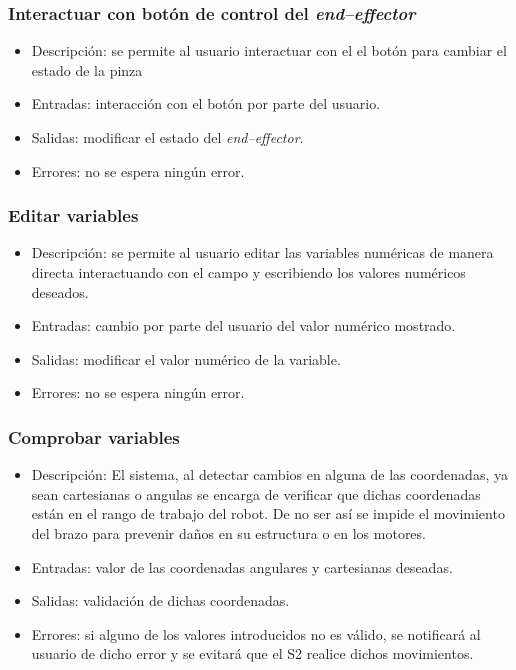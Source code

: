 \subsubsection{Interactuar con botón de control del \textit{end--effector}}
\begin{itemize}
    \item Descripción: se permite al usuario interactuar con el el botón para cambiar el estado de la pinza
    \item Entradas: interacción con el botón por parte del usuario.
    \item Salidas: modificar el estado del \textit{end--effector}.
    \item Errores: no se espera ningún error.
\end{itemize}

\subsubsection{Editar variables}
\begin{itemize}
    \item Descripción: se permite al usuario editar las variables numéricas de manera directa interactuando con el campo y escribiendo los valores numéricos deseados.
    \item Entradas: cambio por parte del usuario del valor numérico mostrado.
    \item Salidas: modificar el valor numérico de la variable.
    \item Errores: no se espera ningún error.
\end{itemize}

\subsubsection{Comprobar variables}
\begin{itemize}
    \item Descripción: El sistema, al detectar cambios en alguna de las coordenadas, ya sean cartesianas o angulas se encarga de verificar que dichas coordenadas están en el rango de trabajo del robot. De no ser así se impide el movimiento del brazo para prevenir daños en su estructura o en los motores.
    \item Entradas: valor de las coordenadas angulares y cartesianas deseadas.
    \item Salidas: validación de dichas coordenadas.
    \item Errores: si alguno de los valores introducidos no es válido, se notificará al usuario de dicho error y se evitará que el \ac{S2} realice dichos movimientos.
\end{itemize}

